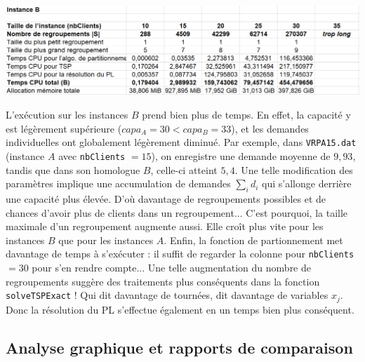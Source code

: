 \documentclass[french, 11pt, a4paper]{article} %
\newcommand{\smb}{\smallbreak}
\begin{document}
\begin{center}
    \includegraphics[scale=0.55]{ResExacte_InstB.PNG}
\end{center}

L'exécution sur les instances $B$ prend bien plus de temps. En effet, la capacité y est légèrement supérieure ($capa_A = 30 < capa_B = 33$), et les demandes individuelles ont globalement légèrement diminué.
Par exemple, dans \verb+VRPA15.dat+ (instance $A$ avec \verb+nbClients+ $=15$), on enregistre une demande moyenne de $9,93$,
tandis que dans son homologue $B$, celle-ci atteint $5,4$.
\smb Une telle modification des paramètres implique une accumulation de demandes $\sum_i d_i$ qui s’allonge derrière une capacité plus élevée. D’où davantage de regroupements possibles et de chances d'avoir plus de clients dans un regroupement...
C'est pourquoi, la taille maximale d’un regroupement augmente aussi. Elle croît plus vite pour les instances $B$ que pour les instances $A$.
\smb Enfin, la fonction de partionnement met davantage de temps à s’exécuter : il suffit de regarder la colonne pour \verb+nbClients+ $=30$ pour s’en rendre compte...
Une telle augmentation du nombre de regroupements suggère des traitements plus conséquents dans la fonction \verb+solveTSPExact+ !
Qui dit davantage de tournées, dit davantage de variables $x_j$. Donc la résolution du PL s’effectue également en un temps bien plus conséquent.

\subsection{Analyse graphique et rapports de comparaison}
\end{document}
